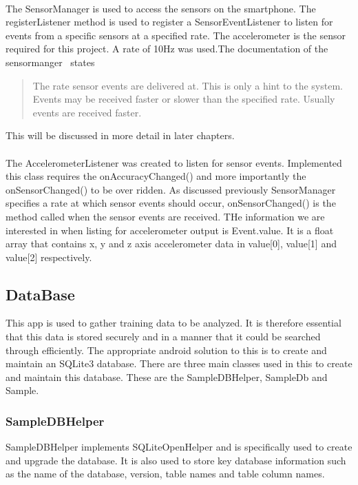 \paragraph{}
The SensorManager is used to access the sensors on the smartphone. The registerListener method is used to register a SensorEventListener to listen for events from a specific sensors at a specified rate. The accelerometer is the sensor required for this project. A rate of 10Hz was used.The documentation of the sensormanger~\cite{android2013manager} states
\begin{quote}
The rate sensor events are delivered at. This is only a hint to the system. Events may be received faster or slower than the specified rate. Usually events are received faster.
\end{quote}
This will be discussed in more detail in later chapters.
\paragraph{}
The AccelerometerListener was created to listen for sensor events. Implemented this class requires the onAccuracyChanged() and more importantly the onSensorChanged() to be over ridden. As discussed previously SensorManager specifies a rate at which sensor events should occur, onSensorChanged() is the method called when the sensor events are received. THe information we are interested in when listing for accelerometer output is Event.value. It is a float array that contains x, y and z axis accelerometer data in value[0], value[1] and value[2] respectively. 

\subsection{DataBase} %
\label{sub:data_gathering}
This app is used to gather training data to be analyzed. It is therefore essential that this data is stored securely and in a manner that it could be searched through efficiently. The appropriate android solution to this is to create and maintain an SQLite3 database. There are three main classes used in this to create and maintain this database. These are the SampleDBHelper, SampleDb and Sample. 
\subsubsection{SampleDBHelper} %
\label{ssub:db_helper}
SampleDBHelper implements SQLiteOpenHelper and is specifically used to create and upgrade the database. It is also used to store key database information such as the name of the database, version, table names and table column names. 

